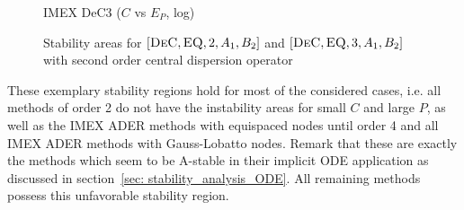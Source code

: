 \begin{example}
\begin{figure}
\begin{minipage}[t]{0.32\textwidth}
			IMEX DeC3 ($C$ vs $E_P$, log)
		\end{minipage}
		\caption{Stability areas for $[\textsc{DeC}, \textsc{EQ},2,A_1, B_2]$ and $[\textsc{DeC}, \textsc{EQ},3,A_1, B_2]$ with second order central dispersion operator}
		\label{fig: disp_IIMEXDeC2/3}
	\end{figure}
\end{example}
These exemplary stability regions hold for most of the considered cases, i.e. all methods of order 2 do not have the instability areas for small $C$ and large $P$, as well as the IMEX ADER methods with equispaced nodes until order 4 and all IMEX ADER methods with Gauss-Lobatto nodes. 
Remark that these are exactly the methods which seem to be A-stable in their implicit ODE application as discussed in section~\ref{sec: stability_analysis_ODE}. 
All remaining methods possess this unfavorable stability region. 


